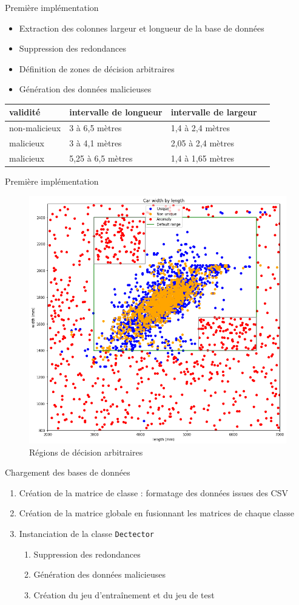 \documentclass[usenames,dvipsnames]{beamer}
\begin{document}
\begin{frame}{Première implémentation}
\begin{itemize}
\item Extraction des colonnes largeur et longueur de la base de données
\item Suppression des redondances
\item Définition de zones de décision arbitraires
\item Génération des données malicieuses
\end{itemize}
\begin{table}
\centering
\begin{tabular}{llll}
validité & intervalle de longueur & intervalle de largeur \\
\hline
non-malicieux & 3 à 6,5 mètres & 1,4 à 2,4 mètres \\
malicieux & 3 à 4,1 mètres & 2,05 à 2,4 mètres \\
malicieux & 5,25 à 6,5 mètres & 1,4 à 1,65 mètres \\
\end{tabular}
\end{table}
\end{frame}

\begin{frame}{Première implémentation}
\begin{figure}
\centering
\includegraphics[width=.56\textwidth]{img/first_try.png}
\caption{Régions de décision arbitraires}
\end{figure}
\end{frame}

\begin{frame}{Chargement des bases de données}

\begin{enumerate}
\item Création de la matrice de classe : formatage des données issues des CSV
\item Création de la matrice globale en fusionnant les matrices de chaque classe
\item Instanciation de la classe \texttt{Dectector} \begin{enumerate}
\item Suppression des redondances
\item Génération des données malicieuses
\item Création du jeu d'entraînement et du jeu de test
\end{enumerate}
\end{enumerate}
\end{frame}
\end{document}

